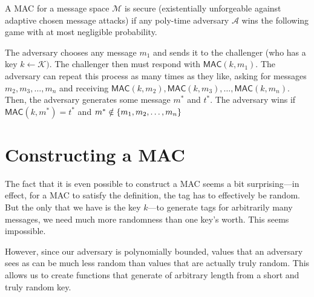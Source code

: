 \begin{definition}
	A MAC for a message space $\mathcal{M}$ is secure (existentially unforgeable against adaptive chosen message attacks) if any poly-time adversary $\mathcal{A}$ wins the following game with at most negligible probability.

	The adversary chooses any message $m_1$ and sends it to the challenger (who has a key $k \leftarrow \mathcal{K})$. The challenger then must respond with $\mathsf{MAC}(k, m_1)$. The adversary can repeat this process as many times as they like, asking for messages $m_2, m_3, \ldots, m_n$ and receiving $\mathsf{MAC}(k, m_2), \mathsf{MAC}(k, m_3), \ldots, \mathsf{MAC}(k, m_n)$. Then, the adversary generates some message $m^*$ and $t^*$. The adversary wins if $\mathsf{MAC}(k, m^*) = t^*$ and $m^* \notin \left\{ m_1, m_2, \ldots, m_n \right\}$

\end{definition}

\section{Constructing a MAC}
The fact that it is even possible to construct a MAC seems a bit surprising---in effect, for a MAC to satisfy the definition, the tag has to effectively be random. But the only  that we have is the key $k$---to generate tags for arbitrarily many messages, we need much more randomness than one key's worth. This seems impossible.

However, since our adversary is polynomially bounded, values that an adversary sees as  can be much less random than values that are actually truly random. This allows us to create functions that generate  of arbitrary length from a short and truly random key.


